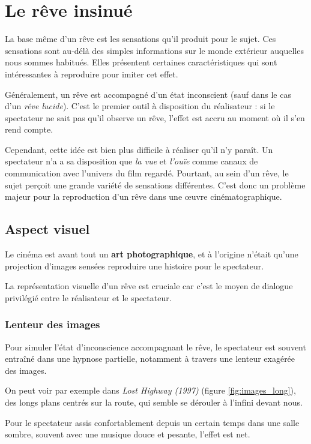 \documentclass[../main.tex]{subfile}
\begin{document}
\section{Le rêve insinué}

La base même d'un rêve est les sensations qu'il produit pour le sujet. Ces
sensations sont au-délà des simples informations sur le monde extérieur
auquelles nous sommes habitués. Elles présentent certaines caractéristiques qui
sont intéressantes à reproduire pour imiter cet effet.

Généralement, un rêve est accompagné d'un état inconscient (sauf dans le cas
d'un \emph{rêve lucide}). C'est le premier outil à disposition du réalisateur :
si le spectateur ne sait pas qu'il observe un rêve, l'effet est accru au moment
où il s'en rend compte.

Cependant, cette idée est bien plus difficile à réaliser qu'il n'y paraît. Un
spectateur n'a a sa disposition que \emph{la vue} et \emph{l'ouïe} comme canaux
de communication avec l'univers du film regardé. Pourtant, au sein d'un rêve,
le sujet perçoit une grande variété de sensations différentes. C'est donc un
problème majeur pour la reproduction d'un rêve dans une \oe{}uvre
cinématographique.

\subsection{Aspect visuel}

Le cinéma est avant tout un \textbf{art photographique}, et à l'origine n'était
qu'une projection d'images sensées reproduire une histoire pour le spectateur.

La représentation visuelle d'un rêve est cruciale car c'est le moyen de
dialogue privilégié entre le réalisateur et le spectateur.

\subsubsection{Lenteur des images}
\label{sec:lenteur}

Pour simuler l'état d'inconscience accompagnant le rêve, le spectateur est
souvent entraîné dans une hypnose partielle, notamment à travers une lenteur
exagérée des images.

On peut voir par exemple dans \textit{Lost Highway (1997)} (figure
\ref{fig:images_long}), des longs plans centrés sur la route, qui semble se
dérouler à l'infini devant nous.

Pour le spectateur assis confortablement depuis un certain temps dans une salle
sombre, souvent avec une musique douce et pesante, l'effet est net.
\end{document}

